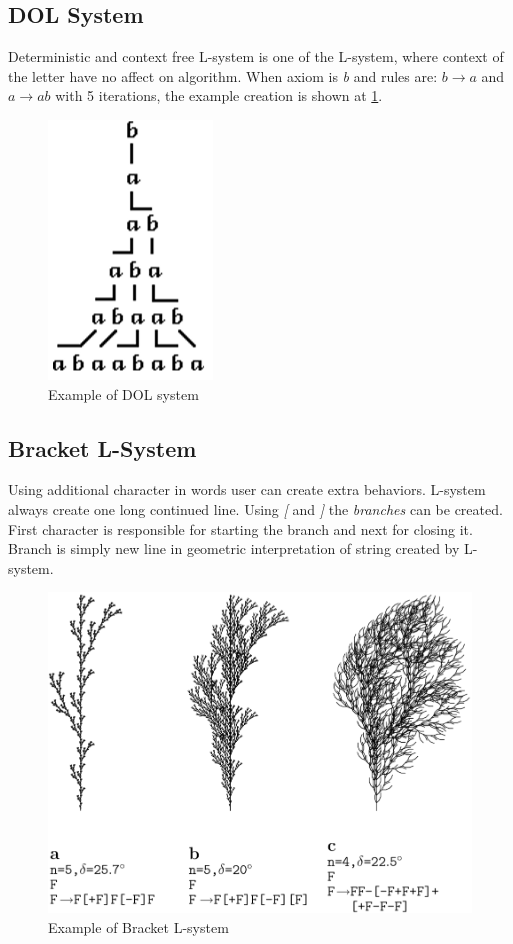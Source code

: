 \documentclass[b5paper,twoside,11pt]{article}
\begin{document}
\subsection{DOL System}
Deterministic and context free L-system is one of the L-system, where context of the letter have no affect on algorithm. When axiom is \textit{b} and rules are: $b \rightarrow a$ and $a \rightarrow ab$ with 5 iterations, the example creation is shown at \figurename\ref{DOL}.

\begin{figure}[!htp]
\centering
  \includegraphics[width=0.15\linewidth]{DOL-system}
\caption{Example of DOL system\cite{prusinABOP} \label{DOL}}
\end{figure}
\FloatBarrier
\subsection{Bracket L-System}
Using additional character in words user can create extra behaviors. L-system always create one long continued line. Using \textit{[} and \textit{]} the \textit{branches} can be created. First character is responsible for starting the branch and next for closing it. Branch is simply new line in geometric interpretation of string created by L-system.
\begin{figure}[!htp]
\centering
  \includegraphics[width=0.7\linewidth]{branchingL}
\caption{Example of Bracket L-system\cite{prusinABOP} \label{branchingL}}
\end{figure}
\end{document}
